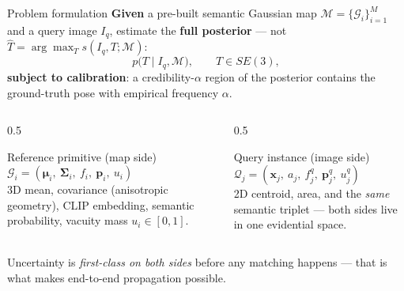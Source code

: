 \documentclass[aspectratio=169,10pt]{beamer}
\begin{document}
\begin{frame}{Problem formulation}
  \textbf{Given} a pre-built semantic Gaussian map
  $\mathcal{M} = \{\mathcal{G}_i\}_{i=1}^{M}$ and a query image $I_q$,
  estimate the \textbf{full posterior} --- not
  $\hat{T} = \arg\max_T s(I_q, T; \mathcal{M})$:
  \begin{equation*}
    p\big(T \mid I_q, \mathcal{M}\big), \qquad T \in SE(3),
  \end{equation*}
  \textbf{subject to calibration}: a credibility-$\alpha$ region of the
  posterior contains the ground-truth pose with empirical frequency
  $\alpha$.
  \vspace{2mm}
  \begin{columns}[T]
    \begin{column}{0.5\textwidth}
      \begin{block}{Reference primitive (map side)}
        \small
        $\mathcal{G}_i = (\bm\mu_i,\ \bm\Sigma_i,\ f_i,\ \mathbf{p}_i,\ u_i)$\\[1mm]
        3D mean, covariance (anisotropic geometry), CLIP embedding,
        semantic probability, \alert{vacuity mass $u_i \in [0,1]$}.
      \end{block}
    \end{column}
    \begin{column}{0.5\textwidth}
      \begin{block}{Query instance (image side)}
        \small
        $\mathcal{Q}_j = (\mathbf{x}_j,\ a_j,\ f_j^q,\ \mathbf{p}_j^q,\ u_j^q)$\\[1mm]
        2D centroid, area, and the \emph{same} semantic triplet ---
        both sides live in one evidential space.
      \end{block}
    \end{column}
  \end{columns}
  \vspace{2mm}
  \small Uncertainty is \emph{first-class on both sides} before any matching
  happens --- that is what makes end-to-end propagation possible.
\end{frame}
\end{document}
